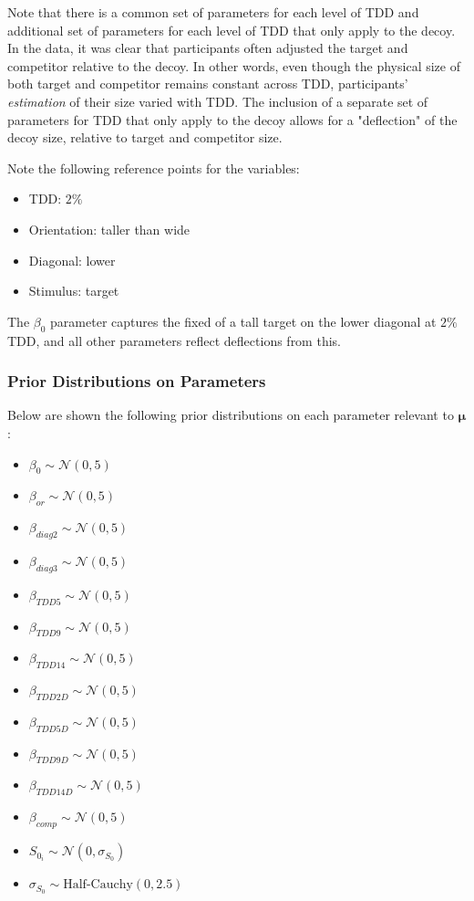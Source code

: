 Note that there is a common set of parameters for each level of TDD and additional set of parameters for each level of TDD that only apply to the decoy. In the data, it was clear that participants often adjusted the target and competitor relative to the decoy. In other words, even though the physical size of both target and competitor remains constant across TDD, participants' \textit{estimation} of their size varied with TDD. The inclusion of a separate set of parameters for TDD that only apply to the decoy allows for a "deflection" of the decoy size, relative to target and competitor size. 

Note the following reference points for the variables:
\begin{itemize}
    \item TDD: $2\%$
    \item Orientation: taller than wide
    \item Diagonal: lower
    \item Stimulus: target
\end{itemize}

The $\beta_{0}$ parameter captures the fixed of a tall target on the lower diagonal at $2\%$ TDD, and all other parameters reflect deflections from this.

\subsubsection{Prior Distributions on Parameters}
Below are shown the following prior distributions on each parameter relevant to $\boldsymbol{\mu}$:
\begin{itemize}
    \item $\beta_{0} \sim \mathcal{N}(0,5)$
    \item $\beta_{or} \sim \mathcal{N}(0,5)$
    \item $\beta_{diag2} \sim \mathcal{N}(0,5)$
    \item $\beta_{diag3} \sim \mathcal{N}(0,5)$
    \item $\beta_{TDD5} \sim \mathcal{N}(0,5)$
    \item $\beta_{TDD9} \sim \mathcal{N}(0,5)$
    \item $\beta_{TDD14} \sim \mathcal{N}(0,5)$
    \item $\beta_{TDD2D} \sim \mathcal{N}(0,5)$
    \item $\beta_{TDD5D} \sim \mathcal{N}(0,5)$
    \item $\beta_{TDD9D} \sim \mathcal{N}(0,5)$
    \item $\beta_{TDD14D} \sim \mathcal{N}(0,5)$
    \item $\beta_{comp} \sim \mathcal{N}(0,5)$
    \item $S_{0_i} \sim \mathcal{N}(0,\sigma_{S_0})$
    \item $\sigma_{S_0} \sim \text{Half-Cauchy}(0, 2.5)$
\end{itemize}

